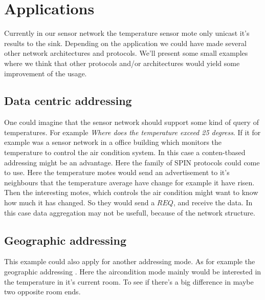 \section{Applications}
Currently in our sensor network the temperature sensor mote only unicast it's results to the sink. Depending on the application we could have made several other network architectures and protocols. We'll present some small examples where we think that other protocols and/or architectures would yield some improvement of the usage.
\subsection{Data centric addressing}
 One could imagine that the sensor network should support some kind of query of temperatures. For example \emph{Where does the temperature exceed 25 degress}. If it for example was a sensor network in a office building which monitors the temperature to control the air condition system. In this case a conten-tbased addressing\cite[p.~194]{karl2007protocols} might be an advantage. Here the family of SPIN \cite[p.~335-336]{karl2007protocols} protocols could come to use. Here the temperature motes would send an advertisement to it's neighbours that the temperature average have change for example it have risen. Then the interesting motes, which controls the air condition might want to know how much it has changed. So they would send a $REQ$, and receive the data. In this case data aggregation may not be usefull, because of the network structure.
 \subsection{Geographic addressing}
This example could also apply for another addressing mode. As for example the geographic addressing \cite[p.~195]{karl2007protocols}. Here the aircondition mode mainly would be interested in the temperature in it's current room. To see if there's a big difference in maybe two opposite room ends. 
